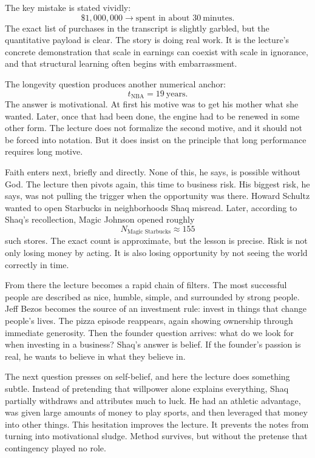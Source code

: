 The key mistake is stated vividly:
\begin{equation}
\text{\$}1{,}000{,}000 \to \text{spent in about }30\ \text{minutes}.
\end{equation}
The exact list of purchases in the transcript is slightly garbled, but the quantitative payload is clear. The story is doing real work. It is the lecture's concrete demonstration that scale in earnings can coexist with scale in ignorance, and that structural learning often begins with embarrassment.

The longevity question produces another numerical anchor:
\begin{equation}
t_{\text{NBA}} = 19\ \text{years}.
\end{equation}
The answer is motivational. At first his motive was to get his mother what she wanted. Later, once that had been done, the engine had to be renewed in some other form. The lecture does not formalize the second motive, and it should not be forced into notation. But it does insist on the principle that long performance requires long motive.

Faith enters next, briefly and directly. None of this, he says, is possible without God. The lecture then pivots again, this time to business risk. His biggest risk, he says, was not pulling the trigger when the opportunity was there. Howard Schultz wanted to open Starbucks in neighborhoods Shaq misread. Later, according to Shaq's recollection, Magic Johnson opened roughly
\begin{equation}
N_{\text{Magic Starbucks}} \approx 155
\end{equation}
such stores. The exact count is approximate, but the lesson is precise. Risk is not only losing money by acting. It is also losing opportunity by not seeing the world correctly in time.

From there the lecture becomes a rapid chain of filters. The most successful people are described as nice, humble, simple, and surrounded by strong people. Jeff Bezos becomes the source of an investment rule: invest in things that change people's lives. The pizza episode reappears, again showing ownership through immediate generosity. Then the founder question arrives: what do we look for when investing in a business? Shaq's answer is belief. If the founder's passion is real, he wants to believe in what they believe in.

The next question presses on self-belief, and here the lecture does something subtle. Instead of pretending that willpower alone explains everything, Shaq partially withdraws and attributes much to luck. He had an athletic advantage, was given large amounts of money to play sports, and then leveraged that money into other things. This hesitation improves the lecture. It prevents the notes from turning into motivational sludge. Method survives, but without the pretense that contingency played no role.

